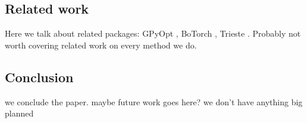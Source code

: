 \subsection{Related work}
Here we talk about related packages: GPyOpt \cite{gpyopt2016}, BoTorch \cite{balandat2020botorch}, Trieste \cite{picheny2023trieste}. Probably not worth covering related work on every method we do.

\subsection{Conclusion}
we conclude the paper. maybe future work goes here? we don't have anything big planned